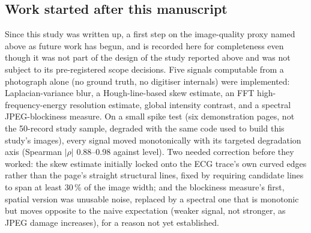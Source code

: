 \subsection*{Work started after this manuscript}
Since this study was written up, a first step on the image-quality proxy named above as future work has begun, and is recorded here for completeness even though it was not part of the design of the study reported above and was not subject to its pre-registered scope decisions. Five signals computable from a photograph alone (no ground truth, no digitiser internals) were implemented: Laplacian-variance blur, a Hough-line-based skew estimate, an FFT high-frequency-energy resolution estimate, global intensity contrast, and a spectral JPEG-blockiness measure. On a small spike test (six demonstration pages, not the 50-record study sample, degraded with the same code used to build this study's images), every signal moved monotonically with its targeted degradation axis (Spearman $|\rho|$ 0.88--0.98 against level). Two needed correction before they worked: the skew estimate initially locked onto the ECG trace's own curved edges rather than the page's straight structural lines, fixed by requiring candidate lines to span at least 30\,\% of the image width; and the blockiness measure's first, spatial version was unusable noise, replaced by a spectral one that is monotonic but moves opposite to the naive expectation (weaker signal, not stronger, as JPEG damage increases), for a reason not yet established.

